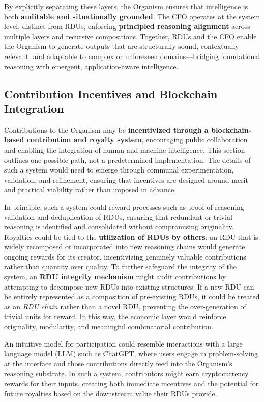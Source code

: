 \documentclass[12pt]{article}
\begin{document}
By explicitly separating these layers, the Organism ensures that intelligence is both \textbf{auditable and situationally grounded}. The CFO operates at the system level, distinct from RDUs, enforcing \textbf{principled reasoning alignment} across multiple layers and recursive compositions. Together, RDUs and the CFO enable the Organism to generate outputs that are structurally sound, contextually relevant, and adaptable to complex or unforeseen domains—bridging foundational reasoning with emergent, application-aware intelligence.


\subsection{Contribution Incentives and Blockchain Integration}

Contributions to the Organism may be \textbf{incentivized through a blockchain-based contribution and royalty system}, encouraging public collaboration and enabling the integration of human and machine intelligence. This section outlines one possible path, not a predetermined implementation. The details of such a system would need to emerge through communal experimentation, validation, and refinement, ensuring that incentives are designed around merit and practical viability rather than imposed in advance.  

In principle, such a system could reward processes such as proof-of-reasoning validation and deduplication of RDUs, ensuring that redundant or trivial reasoning is identified and consolidated without compromising originality. Royalties could be tied to the \textbf{utilization of RDUs by others}: an RDU that is widely recomposed or incorporated into new reasoning chains would generate ongoing rewards for its creator, incentivizing genuinely valuable contributions rather than quantity over quality. To further safeguard the integrity of the system, an \textbf{RDU integrity mechanism} might audit contributions by attempting to decompose new RDUs into existing structures. If a new RDU can be entirely represented as a composition of pre-existing RDUs, it could be treated as an \textit{RDU chain} rather than a novel RDU, preventing the over-generation of trivial units for reward. In this way, the economic layer would reinforce originality, modularity, and meaningful combinatorial contribution.  

An intuitive model for participation could resemble interactions with a large language model (LLM) such as ChatGPT, where users engage in problem-solving at the interface and those contributions directly feed into the Organism’s reasoning substrate. In such a system, contributors might earn cryptocurrency rewards for their inputs, creating both immediate incentives and the potential for future royalties based on the downstream value their RDUs provide.  
\end{document}

